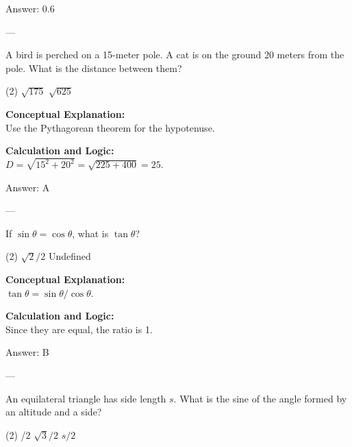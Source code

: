 \documentclass[11pt,paper=a4,answers]{exam}
\begin{document}
\begin{questions}
\begin{solution}
\vspace{15pt}
Answer: \colorbox{yellow!100}{0.6}
\end{solution}

---

\question
A bird is perched on a 15-meter pole. A cat is on the ground 20 meters from the pole. What is the distance between them?
\begin{tasks}(2)
    \task $\sqrt{175}$
    \task $\sqrt{625}$
\end{tasks}

\begin{solution}
\textbf{Conceptual Explanation:} \\
Use the Pythagorean theorem for the hypotenuse.

\vspace{10pt}
\textbf{Calculation and Logic:} \\
$D = \sqrt{15^2 + 20^2} = \sqrt{225 + 400} = 25$.

\vspace{15pt}
Answer: \colorbox{yellow!100}{A}
\end{solution}

---

\question
If $\sin \theta = \cos \theta$, what is $\tan \theta$?
\begin{tasks}(2)
    \task $\sqrt{2}/2$
    \task Undefined
\end{tasks}

\begin{solution}
\textbf{Conceptual Explanation:} \\
$\tan \theta = \sin \theta / \cos \theta$.

\vspace{10pt}
\textbf{Calculation and Logic:} \\
Since they are equal, the ratio is 1.

\vspace{15pt}
Answer: \colorbox{yellow!100}{B}
\end{solution}

---

\question
An equilateral triangle has side length $s$. What is the sine of the angle formed by an altitude and a side?
\begin{tasks}(2)
    /2
    \task $\sqrt{3}/2$
    \task $s/2$
\end{tasks}


\end{questions}
\end{document}
